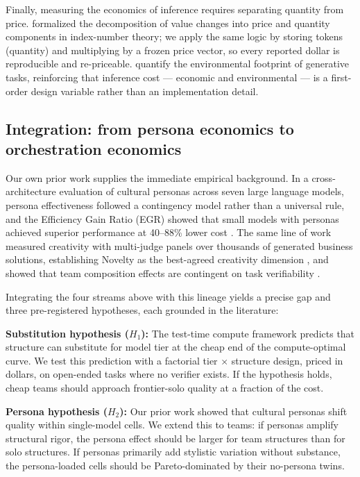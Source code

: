\documentclass[12pt,a4paper]{article}
\begin{document}
Finally, measuring the economics of inference requires separating quantity from
price. \citet{Diewert1976} formalized the decomposition of value changes into
price and quantity components in index-number theory; we apply the same logic
by storing tokens (quantity) and multiplying by a frozen price vector, so every
reported dollar is reproducible and re-priceable. \citet{TomlinsonEtAl2024}
quantify the environmental footprint of generative tasks, reinforcing that
inference cost --- economic and environmental --- is a first-order design
variable rather than an implementation detail.

\subsection{Integration: from persona economics to orchestration economics}

Our own prior work supplies the immediate empirical background. In a
cross-architecture evaluation of cultural personas across seven large language
models, persona effectiveness followed a contingency model rather than a
universal rule, and the Efficiency Gain Ratio (EGR) showed that small models
with personas achieved superior performance at 40--88\% lower cost
\citep{Hariri2026b}. The same line of work measured creativity with multi-judge
panels over thousands of generated business solutions, establishing Novelty as
the best-agreed creativity dimension \citep{Hariri2025a}, and showed that team
composition effects are contingent on task verifiability \citep{Hariri2025b}.

Integrating the four streams above with this lineage yields a precise gap and
three pre-registered hypotheses, each grounded in the literature:

\medskip
\noindent\textbf{Substitution hypothesis ($H_1$):} The test-time compute
framework \citep{SnellEtAl2024} predicts that structure can substitute for
model tier at the cheap end of the compute-optimal curve. We test this
prediction with a factorial tier $\times$ structure design, priced in dollars,
on open-ended tasks where no verifier exists. If the hypothesis holds, cheap
teams should approach frontier-solo quality at a fraction of the cost.

\medskip
\noindent\textbf{Persona hypothesis ($H_2$):} Our prior work
\citep{Hariri2026b} showed that cultural personas shift quality within
single-model cells. We extend this to teams: if personas amplify structural
rigor, the persona effect should be larger for team structures than for solo
structures. If personas primarily add stylistic variation without substance, the
persona-loaded cells should be Pareto-dominated by their no-persona twins.
\end{document}
